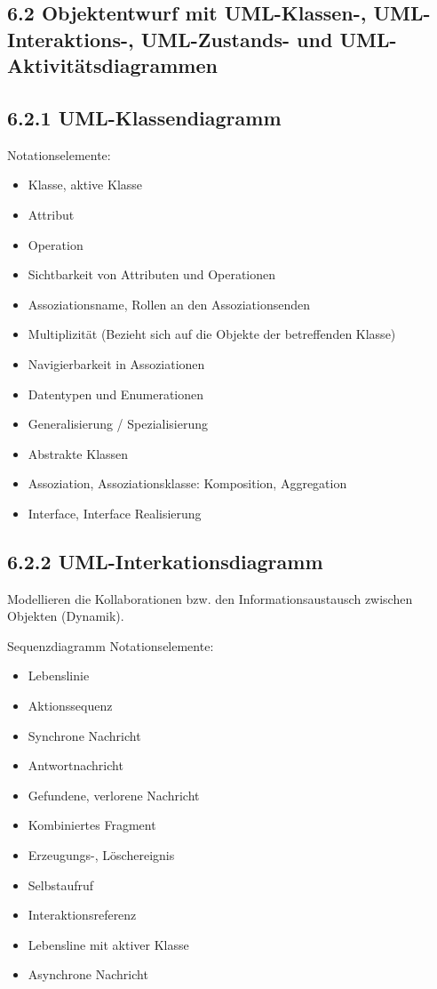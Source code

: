 \documentclass[10pt]{article}
\begin{document}
\subsection*{6.2 Objektentwurf mit UML-Klassen-, UML-Interaktions-, UML-Zustands- und UML-Aktivitätsdiagrammen}
\subsection*{6.2.1 UML-Klassendiagramm}
Notationselemente:

\begin{itemize}
  \item Klasse, aktive Klasse
  \item Attribut
  \item Operation
  \item Sichtbarkeit von Attributen und Operationen
  \item Assoziationsname, Rollen an den Assoziationsenden
  \item Multiplizität (Bezieht sich auf die Objekte der betreffenden Klasse)
  \item Navigierbarkeit in Assoziationen
  \item Datentypen und Enumerationen
  \item Generalisierung / Spezialisierung
  \item Abstrakte Klassen
  \item Assoziation, Assoziationsklasse: Komposition, Aggregation
  \item Interface, Interface Realisierung
\end{itemize}

\subsection*{6.2.2 UML-Interkationsdiagramm}
Modellieren die Kollaborationen bzw. den Informationsaustausch zwischen Objekten (Dynamik).

Sequenzdiagramm Notationselemente:

\begin{itemize}
  \item Lebenslinie
  \item Aktionssequenz
  \item Synchrone Nachricht
  \item Antwortnachricht
  \item Gefundene, verlorene Nachricht
  \item Kombiniertes Fragment
  \item Erzeugungs-, Löschereignis
  \item Selbstaufruf
  \item Interaktionsreferenz
  \item Lebensline mit aktiver Klasse
  \item Asynchrone Nachricht
\end{itemize}
\end{document}
